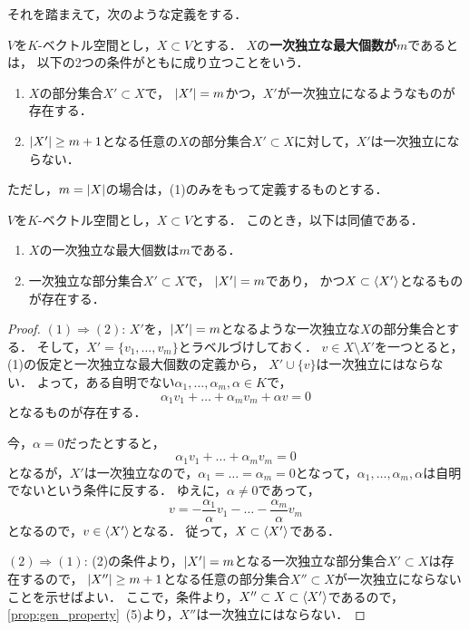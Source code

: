 それを踏まえて，次のような定義をする．
\begin{dfn}
  $V$を$K$-ベクトル空間とし，$X \subset V$とする．
  $X$の\textbf{一次独立な最大個数が$m$}であるとは，
  以下の2つの条件がともに成り立つことをいう．
  \begin{enumerate}
    \item $X$の部分集合$X' \subset X$で，
    $\left|X'\right| = m$かつ，$X'$が一次独立になるようなものが存在する．
    \item $\left|X'\right|\ge m+1$となる任意の$X$の部分集合$X' \subset X$に対して，$X'$は一次独立にならない．
  \end{enumerate}
  ただし，$m=\left|X\right|$の場合は，(1)のみをもって定義するものとする．
\end{dfn}
\begin{prop}\label{prop:MI_equiv}
  $V$を$K$-ベクトル空間とし，$X \subset V$とする．
  このとき，以下は同値である．
  \begin{enumerate}
    \item $X$の一次独立な最大個数は$m$である．
    \item 一次独立な部分集合$X' \subset X$で，
    $\left|X'\right|=m$であり，
    かつ$X \subset \left\langle X' \right\rangle$となるものが存在する．
  \end{enumerate}
\end{prop}
\begin{proof}
  $(1) \Rightarrow (2)$:
  $X'$を，$\left|X'\right|=m$となるような一次独立な$X$の部分集合とする．
  そして，$X'=\{v_1,\dots,v_m\}$とラベルづけしておく．
  $v \in X \setminus X'$を一つとると，
  (1)の仮定と一次独立な最大個数の定義から，
  $X' \cup \{v\}$は一次独立にはならない．
  よって，ある自明でない$\alpha_1,\dots,\alpha_m,\alpha \in K$で，
  \[
    \alpha_1 v_1 + \dots + \alpha_m v_m + \alpha v = 0  
  \]
  となるものが存在する．

  今，$\alpha = 0$だったとすると，
  \[
    \alpha_1 v_1 + \dots + \alpha_m v_m = 0
  \]
  となるが，$X'$は一次独立なので，$\alpha_1 = \dots = \alpha_m = 0$となって，$\alpha_1,\dots,\alpha_m,\alpha$は自明でないという条件に反する．
  ゆえに，$\alpha \neq 0$であって，
  \[
    v = - \frac{\alpha_1}{\alpha} v_1 - \dots - \frac{\alpha_m}{\alpha} v_m
  \]
  となるので，$v \in \left\langle X' \right\rangle$となる．
  従って，$X\subset \left\langle X' \right\rangle$である．

  $(2) \Rightarrow (1)$:
  (2)の条件より，$\left|X'\right|=m$となる一次独立な部分集合$X'\subset X$は存在するので，
  $\left|X''\right| \ge m + 1$となる任意の部分集合$X'' \subset X$が一次独立にならないことを示せばよい．
  ここで，条件より，$X'' \subset X \subset \left\langle X' \right\rangle$であるので，
  \cref{prop:gen_property}~(5)より，$X''$は一次独立にはならない．
\end{proof}
